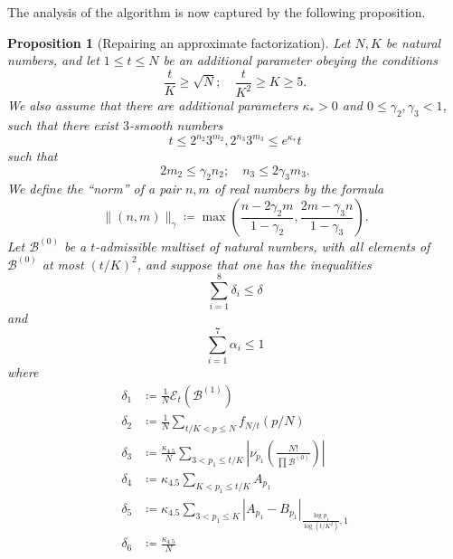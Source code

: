 \documentclass[12pt,a4paper,reqno]{amsart}
\numberwithin{equation}{section}
\theoremstyle{plain}
\newtheorem{proposition}[theorem]{Proposition}
\theoremstyle{definition}
\newcommand\tuple{{\mathcal B}}
\newcommand\excess{{\mathcal{E}}}
\begin{document}
The analysis of the algorithm is now captured by the following proposition.

\begin{proposition}[Repairing an approximate factorization]\label{repair}  Let $N, K$ be natural numbers, and let $1 \leq t \leq N$ be an additional parameter obeying the conditions
\begin{equation}\label{conditions}
    \frac{t}{K} \geq \sqrt{N}; \quad \frac{t}{K^2} \geq K \geq 5.
\end{equation}
We also assume that there are additional parameters $\kappa_* > 0$ and $0 \leq \gamma_2, \gamma_3 < 1$, such that there exist $3$-smooth numbers
\begin{equation}\label{tlip} 
  t \leq 2^{n_2} 3^{m_2}, 2^{n_3} 3^{m_3} \leq e^{\kappa_*} t
\end{equation}
such that
\begin{equation}\label{nm}
  2m_2 \leq \gamma_2 n_2; \quad n_3 \leq 2\gamma_3 m_3.
\end{equation}
We define the ``norm'' of a pair $n,m$ of real numbers by the formula
$$ \| (n,m) \|_\gamma \coloneqq \max\left( \frac{n-2\gamma_2 m}{1-\gamma_2}, \frac{2m-\gamma_3 n}{1-\gamma_3} \right).$$
Let $\tuple^{(0)}$ be a $t$-admissible multiset of natural numbers, with all elements of $\tuple^{(0)}$ at most $(t/K)^2$, and suppose that one has the inequalities
\begin{equation}\label{delta-cond}
\sum_{i=1}^8 \delta_i \leq \delta
\end{equation}
and
\begin{equation}\label{alpha-cond}
  \sum_{i=1}^7 \alpha_i \leq 1
\end{equation} 
where
\begin{align}
\delta_1 &\coloneqq \frac{1}{N} \excess_t(\tuple^{(1)}) \label{delta1-def}  \\
\delta_2 &\coloneqq \frac{1}{N} \sum_{t/K < p \leq N} f_{N/t}(p/N) \label{delta2-def}  \\
\delta_3 &\coloneqq \frac{\kappa_{4.5}}{N}  \sum_{3 < p_1 \leq t/K} \left|\nu_{p_1}\left( \frac{N!}{\prod \tuple^{(0)}} \right)\right| \label{delta3-def}  \\
\delta_4 &\coloneqq \kappa_{4.5} \sum_{K < p_1 \leq t/K} A_{p_1} \label{delta4-def}  \\
\delta_5 &\coloneqq \kappa_{4.5} \sum_{3 < p_1 \leq K} |A_{p_1} - B_{p_1}|_{\frac{\log p_1}{\log(t/K^2)},1} \label{delta5-def}  \\
\delta_6 &\coloneqq \frac{\kappa_{4.5}}{N} \label{delta6-def}  \\

\end{align}
\end{proposition}
\end{document}
